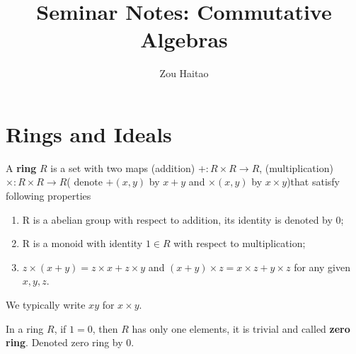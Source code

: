 \documentclass{amsart}
\title{Seminar Notes: Commutative Algebras}
\author{Zou Haitao}
\begin{document}
\maketitle
\tableofcontents
\section{Rings and Ideals}
\begin{secdefn}
A \textbf{ring} $R$ is a set with two maps (addition) $+ : R \times R \rightarrow R$, (multiplication)$\times : R \times R \rightarrow R$( denote $+(x,y)$ by $x+y$ and $\times (x,y)$ by $x \times y$)that satisfy following properties
\begin{enumerate}
\item R is a abelian group with respect to addition, its identity is denoted by $0$;
\item R is a monoid with identity $1 \in R$ with respect to multiplication;
\item $z \times (x+y)= z \times x + z \times y$ and $(x+y) \times z = x \times z + y \times z$ for any given $x,y,z$.
\end{enumerate}
We typically write $xy$ for $x \times y$.
\end{secdefn}
In a ring $R$, if $1=0$, then $R$ has only one elements, it is trivial and called \textbf{zero ring}. Denoted zero ring by 0.
\end{document}
